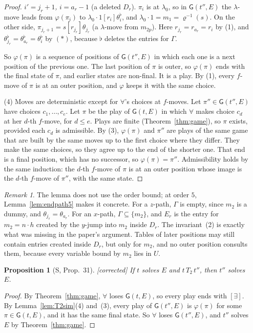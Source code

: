 \documentclass[11pt]{article}
\newcommand{\Gm}{\mathsf{G}}
\newcommand{\suc}[2]{#1{\cdot}#2}
\newcommand{\Fixed}{\textsf{[corrected]}}
\theoremstyle{plain}
\newtheorem{proposition}[theorem]{Proposition}
\theoremstyle{definition}
\theoremstyle{remark}
\newtheorem{remark}[theorem]{Remark}
\begin{document}
\begin{proof}
\emph{$i'=j_r+1$, $i=a_r-1$} (a deleted $D_r$).  $\pi_i$ is at
$\lambda_0$, so in $\Gm(t'',E)$ the $\lambda$-move leads from
$\varphi(\pi_i)$ to $\suc{\lambda_0}1[r_i]\theta_i^\flat$, and
$\suc{\lambda_0}1=m_1=\varrho^{-1}(s)$.  On the other side,
$\pi_{j_r+1}=s[r_{j_r}]\theta_{j_r}$ (a $\lambda$-move from
$m_{2p}$).  Here $r_{j_r}=r_{a_r}=r_i$ by (1), and
$\theta_{j_r}^\flat=\theta_{a_r}^\flat=\theta_i^\flat$ by $(*)$, because
$\flat$ deletes the entries for $\Gamma$.

So $\varphi(\pi)$ is a sequence of positions of $\Gm(t'',E)$ in which
each one is a next position of the previous one.  The last position of
$\pi$ is outer, so $\varphi(\pi)$ ends with the final state of $\pi$, and
earlier states are non-final.  It is a play.  By (1), every $f$-move
of $\pi$ is at an outer position, and $\varphi$ keeps it with the same
choice.

(4) Moves are deterministic except for $\forall$'s choices at $f$-moves.
Let $\pi''\in\Gm(t'',E)$ have choices $c_1,\dots,c_e$.  Let $\pi$ be the
play of $\Gm(t,E)$ in which $\forall$ makes choice $c_d$ at her $d$-th
$f$-move, for $d\le e$.  Plays are finite (Theorem~\ref{thm:game}), so
$\pi$ exists, provided each $c_d$ is admissible.  By (3), $\varphi(\pi)$
and $\pi''$ are plays of the same game that are built by the same moves
up to the first choice where they differ.  They make the same choices,
so they agree up to the end of the shorter one.  That end is a final
position, which has no successor, so $\varphi(\pi)=\pi''$.  Admissibility
holds by the same induction: the $d$-th $f$-move of $\pi$ is at an outer
position whose image is the $d$-th $f$-move of $\pi''$, with the same
state.
\end{proof}

\begin{remark}
The lemma does not use the order bound; at order $5$,
Lemma~\ref{lem:endpath5} makes it concrete.  For a $z$-path, $\Gamma$ is
empty, since $m_2$ is a dummy, and $\theta_{j_r}=\theta_{a_r}$.  For an
$x$-path, $\Gamma\subseteq\{m_2\}$, and $E_r$ is the entry for
$m_2=\suc nh$ created by the $y$-jump into $m_2$ inside $D_r$.  The
invariant~(2) is exactly what was missing in the paper's argument.
Tables of later positions may still contain entries created inside
$D_r$, but only for $m_2$, and no outer position consults them, because
every variable bound by $m_2$ lies in $U$.
\end{remark}

\begin{proposition}[S, Prop.~31]\label{prop:T2}
\Fixed{} If $t$ solves $E$ and $t\,T_2\,t''$, then $t''$ solves $E$.
\end{proposition}
\begin{proof}
By Theorem~\ref{thm:game}, $\forall$ loses $\Gm(t,E)$, so every play
ends with $[\exists]$.  By Lemma~\ref{lem:T2sim}(4) and~(3), every play
of $\Gm(t'',E)$ is $\varphi(\pi)$ for some $\pi\in\Gm(t,E)$, and it has
the same final state.  So $\forall$ loses $\Gm(t'',E)$, and $t''$ solves
$E$ by Theorem~\ref{thm:game}.
\end{proof}
\end{document}
